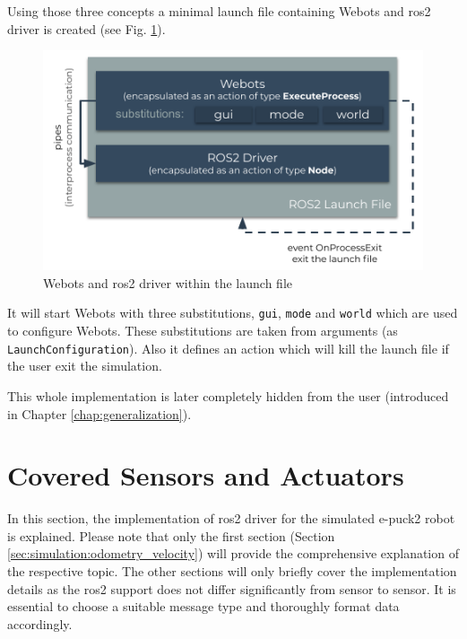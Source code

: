 Using those three concepts a minimal launch file containing Webots and \ac{ros2} driver is created (see Fig. \ref{fig:simulation:webots_launch}).

\begin{figure}[H]
    \centering
    \includegraphics[width=\textwidth]{simulation/figures/webots_launch.pdf}
    \caption{Webots and \ac{ros2} driver within the launch file}
    \label{fig:simulation:webots_launch}
\end{figure}

It will start Webots with three substitutions, \texttt{gui}, \texttt{mode} and \texttt{world} which are used to configure Webots.
These substitutions are taken from arguments (as \texttt{LaunchConfiguration}).
Also it defines an action which will kill the launch file if the user exit the simulation.

This whole implementation is later completely hidden from the user (introduced in Chapter \ref{chap:generalization}).


\section{Covered Sensors and Actuators}

In this section, the implementation of \ac{ros2} driver for the simulated e-puck2 robot is explained.
Please note that only the first section (Section \ref{sec:simulation:odometry_velocity}) will provide the comprehensive explanation of the respective topic.
The other sections will only briefly cover the implementation details as the \ac{ros2} support does not differ significantly from sensor to sensor.
It is essential to choose a suitable message type and thoroughly format data accordingly.

